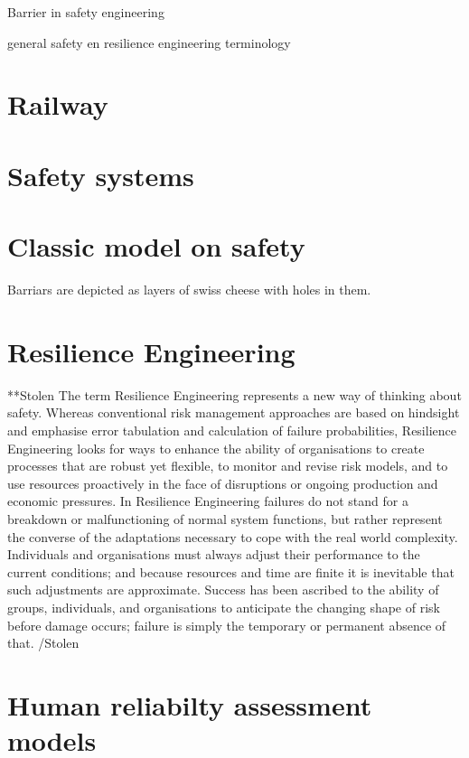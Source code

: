 Barrier in safety engineering

general safety en resilience engineering terminology

\section{Railway}

\section{Safety systems}

\section{Classic model on safety}
Barriars are depicted as layers of swiss cheese with holes in them. 

\section{Resilience Engineering}
\label{sec:resilience_engineering}

**Stolen
The term Resilience Engineering represents a new way of thinking about safety. Whereas conventional risk management approaches are based on hindsight and emphasise error tabulation and calculation of failure probabilities, Resilience Engineering looks for ways to enhance the ability of organisations to create processes that are robust yet flexible, to monitor and revise risk models, and to use resources proactively in the face of disruptions or ongoing production and economic pressures. In Resilience Engineering failures do not stand for a breakdown or malfunctioning of normal system functions, but rather represent the converse of the adaptations necessary to cope with the real world complexity. Individuals and organisations must always adjust their performance to the current conditions; and because resources and time are finite it is inevitable that such adjustments are approximate. Success has been ascribed to the ability of groups, individuals, and organisations to anticipate the changing shape of risk before damage occurs; failure is simply the temporary or permanent absence of that.
/Stolen

\section{Human reliabilty assessment models}


